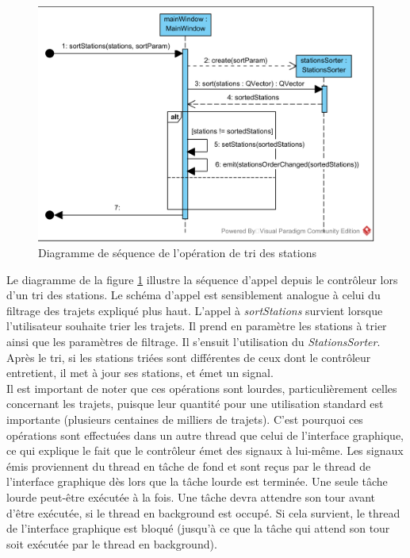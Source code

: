 \documentclass[12pt]{article}
\begin{document}
	\begin{figure}[!h]
	\begin{center}
	\includegraphics[scale=1]{dia_sequence_sortStations.png}
	\caption{Diagramme de séquence de l’opération de tri des stations}
	\label{fig:sortStations}
	\end{center}
	\end{figure}
	
	Le diagramme de la figure \ref{fig:sortStations} illustre la séquence d’appel depuis le contrôleur lors d’un tri des stations. Le schéma d’appel est sensiblement analogue à celui du filtrage des trajets expliqué plus haut. L’appel à \textit{sortStations} survient lorsque l’utilisateur souhaite trier les trajets. Il prend en paramètre les stations à trier ainsi que les paramètres de filtrage. Il s’ensuit l’utilisation du \textit{StationsSorter}. Après le tri, si les stations triées sont différentes de ceux dont le contrôleur entretient, il met à jour ses stations, et émet un signal.\\
	
	Il est important de noter que ces opérations sont lourdes, particulièrement celles concernant les trajets, puisque leur quantité pour une utilisation standard est importante (plusieurs centaines de milliers de trajets). C’est pourquoi ces opérations sont effectuées dans un autre thread que celui de l’interface graphique, ce qui explique le fait que le contrôleur émet des signaux à lui-même. Les signaux émis proviennent du thread en tâche de fond et sont reçus par le thread de l’interface graphique dès lors que la tâche lourde est terminée. Une seule tâche lourde peut-être exécutée à la fois. Une tâche devra attendre son tour avant d’être exécutée, si le thread en background est occupé. Si cela survient, le thread de l’interface graphique est bloqué (jusqu’à ce que la tâche qui attend son tour soit exécutée par le thread en background).\\
		
\end{document}
